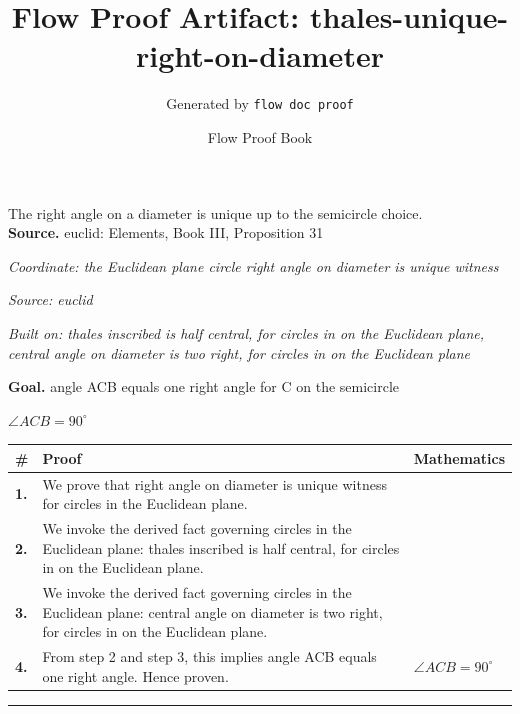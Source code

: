 \documentclass[11pt]{article}
\title{Flow Proof Artifact: thales-unique-right-on-diameter}
\author{Generated by \texttt{flow doc proof}}
\date{Flow Proof Book}
\theoremstyle{definition}
\begin{document}
\maketitle
The right angle on a diameter is unique up to the semicircle choice.\\[0.5em]
\textbf{Source.} euclid: Elements, Book III, Proposition 31\\[0.5em]
\bigskip
{}\par
\smallskip\noindent\textit{Coordinate: the Euclidean plane \cdot circle \cdot right angle on diameter is unique witness}\par
\smallskip\noindent\textit{Source: euclid}\par
\smallskip\noindent\textit{Built on: thales inscribed is half central, for circles in on the Euclidean plane, central angle on diameter is two right, for circles in on the Euclidean plane}\par
\medskip
\noindent\textbf{Goal.} angle ACB equals one right angle for C on the semicircle\par
\noindent$\displaystyle \angle ACB = 90^\circ$\par
\medskip
\noindent
\begin{tabular}{@{} >{\raggedright\arraybackslash}p{} >{\raggedright\arraybackslash}p{} >{\raggedleft\arraybackslash}p{} @{}}
\textbf{\#} & \textbf{Proof} & \textbf{Mathematics} \\
\midrule
\textbf{1.} & We prove that right angle on diameter is unique witness for circles in the Euclidean plane. & \\[0.45em]
\textbf{2.} & We invoke the derived fact governing circles in the Euclidean plane: thales inscribed is half central, for circles in on the Euclidean plane. & \\[0.45em]
\textbf{3.} & We invoke the derived fact governing circles in the Euclidean plane: central angle on diameter is two right, for circles in on the Euclidean plane. & \\[0.45em]
\textbf{4.} & From step 2 and step 3, this implies angle ACB equals one right angle. Hence proven. & $\displaystyle \angle ACB = 90^\circ$ \\[0.45em]
\bottomrule
\end{tabular}
\label{thm:Geometry-circle-right_angle_on_diameter_is_unique_witness}
\par\medskip\hrule
\end{document}
